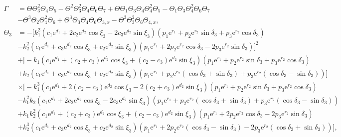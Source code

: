 \documentclass{article}%
\begin{document}
\begin{equation}
\begin{split}
\Gamma&=\Theta\Theta_3^2\Theta_4\Theta_5-\Theta^2\Theta_3^2\Theta_4\Theta_6\Theta_7+\Theta\Theta_1\Theta_3\Theta_4\Theta_4^2\Theta_5-\Theta_1\Theta_3\Theta_4^2\Theta_6\Theta_7\\&-\Theta^3\Theta_2\Theta_4^2\Theta_6+\Theta^3\Theta_3\Theta_4\Theta_6\Theta_{3,x}-\Theta^3\Theta_3^2\Theta_6\Theta_{4,x},\\
\Theta_3&=-\bigg[ k_1^2(c_1\text{e}^{d_1}+2c_2\text{e}^{d_2}\cos\xi_3-2c_3\text{e}^{d_2}\sin\xi_3)(p_1\text{e}^{r_1}+p_2\text{e}^{r_2}\sin\delta_3+p_3\text{e}^{r_2}\cos\delta_3)\\
&-k_2^2(c_1\text{e}^{d_1}+c_3\text{e}^{d_2}\cos\xi_3+c_2\text{e}^{d_2}\sin\xi_3)(p_1\text{e}^{r_1}+2p_2\text{e}^{r_2}\cos\delta_3-2p_3\text{e}^{r_2}\sin\delta_3)\bigg]^2\\
&+\bigg[-k_1(c_1\text{e}^{d_1}+(c_2+c_3)\text{e}^{d_2}\cos\xi_3+(c_2-c_3)\text{e}^{d_2}\sin\xi_3)(p_1\text{e}^{r_1}+p_2\text{e}^{r_2}\sin\delta_3+p_3\text{e}^{r_2}\cos\delta_3)\\
&+k_2(c_1\text{e}^{d_1}+c_3\text{e}^{d_2}\cos\xi_3+c_2\text{e}^{d_2}\sin\xi_3)(p_1\text{e}^{r_1}
+p_2\text{e}^{r_2}(\cos\delta_3+\sin\delta_3) +p_3\text{e}^{r_2}(\cos\delta_3-\sin\delta_3))\bigg]\\
&\times\bigg[-k_1^3(c_1\text{e}^{d_1}+2(c_2-c_3)\text{e}^{d_2}\cos\xi_3-2(c_2+c_3)\text{e}^{d_2}\sin\xi_3) (p_1\text{e}^{r_1}+p_2\text{e}^{r_2}\sin\delta_3+p_3\text{e}^{r_2}\cos\delta_3)\\
&-k_1^2k_2(c_1\text{e}^{d_1}+2c_2\text{e}^{d_2}\cos\xi_3-2c_3\text{e}^{d_2}\sin\xi_3)(p_1\text{e}^{r_1} +p_2\text{e}^{r_2}(\cos\delta_3+\sin\delta_3) +p_3\text{e}^{r_2}(\cos\delta_3-\sin\delta_3))\\
&+k_1k_2^2(c_1\text{e}^{d_1}+(c_2+c_3)\text{e}^{d_2}\cos\xi_3+(c_2-c_3)\text{e}^{d_2}\sin\xi_3)(p_1\text{e}^{r_1}+2p_2\text{e}^{r_2}\cos\delta_3-2p_3\text{e}^{r_2}\sin\delta_3)\\
&+k_2^3(c_1\text{e}^{d_1}+c_3\text{e}^{d_2}\cos\xi_3+c_2\text{e}^{d_2}\sin\xi_3)(p_1\text{e}^{r_1} +2p_2\text{e}^{r_2}(\cos\delta_3-\sin\delta_3) -2p_3\text{e}^{r_2}(\cos\delta_3+\sin\delta_3))\bigg],\\
\end{split}
\end{equation}
\end{document}
